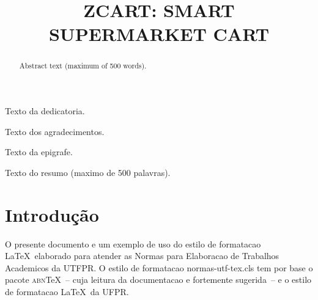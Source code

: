 \documentclass[openright]{normas-utf-tex} %
\title{\MakeUppercase{zCart: Smart Supermarket Cart}} %
\begin{document}
\capa %
\folhaderosto %

\begin{dedicatoria}
Texto da dedicatoria.
\end{dedicatoria}

\begin{agradecimentos}
Texto dos agradecimentos.
\end{agradecimentos}

\begin{epigrafe}
Texto da epigrafe.
\end{epigrafe}

\begin{resumo}
Texto do resumo (maximo de 500 palavras).
\end{resumo}

\begin{abstract}
Abstract text (maximum of 500 words).
\end{abstract}

\listadefiguras %
\listadetabelas %
\listadequadros %
\listadesiglas %
\listadesimbolos %

\sumario %


%
%
%
%

\setcounter{page}{12}

\chapter{Introdução}

O presente documento e um exemplo de uso do estilo de formatacao \LaTeX\ elaborado para atender as Normas para Elaboracao de Trabalhos Academicos da UTFPR. O estilo de formatacao {\ttfamily normas-utf-tex.cls} tem por base o pacote \textsc{abn}\TeX~-- cuja leitura da documentacao \cite{abnTeX2009} e fortemente sugerida~-- e o estilo de formatacao \LaTeX\ da UFPR.
\end{document}
